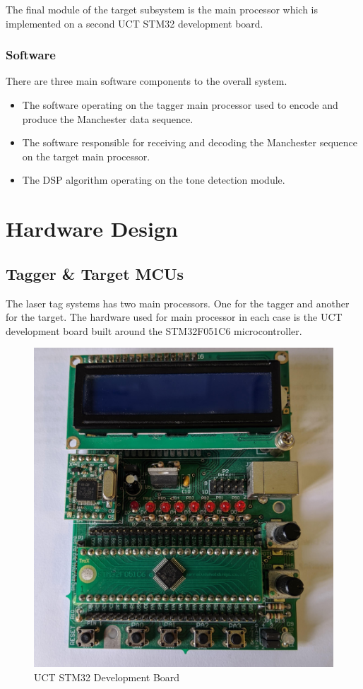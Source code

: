 The final module of the target subsystem is the main processor which is implemented on a second UCT STM32 development board.

\subsubsection{Software}

There are three main software components to the overall system.
\begin{itemize}
	\item The software operating on the tagger main processor used to encode and produce the Manchester data sequence.
	\item The software responsible for receiving and decoding the Manchester sequence on the target main processor.
	\item  The DSP algorithm operating on the tone detection module.
\end{itemize}


\section{Hardware Design}

\subsection{Tagger \& Target MCUs}
The laser tag systems has two main processors. One for the tagger and another for the target. The hardware used for main processor in each case is the UCT development board built around the STM32F051C6 microcontroller.

\begin{figure}[H]
	\centering
	\includegraphics[width=.5\textwidth]{figures/design/dev_board_image.jpg}
	\caption{UCT STM32 Development Board}
	\label{fig:stm32_dev_board}
\end{figure}

